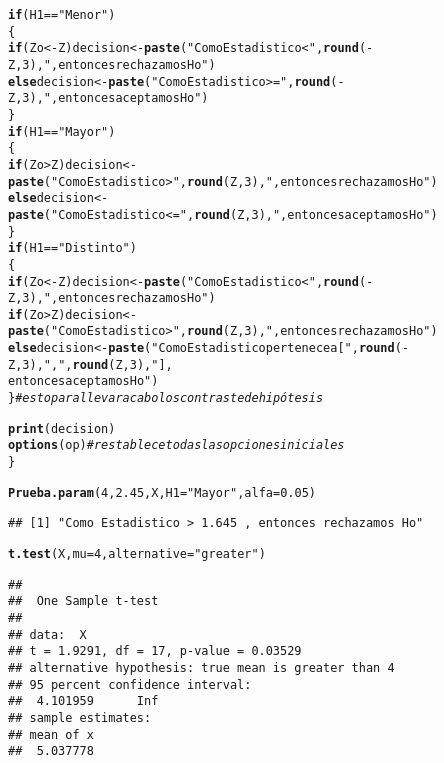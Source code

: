 \documentclass[10pt,a4paper]{article}\usepackage[]{graphicx}\usepackage[]{color}
\makeatletter
\newcommand{\hlnum}[1]{\textcolor[rgb]{0.686,0.059,0.569}{#1}}%
\newcommand{\hlstr}[1]{\textcolor[rgb]{0.192,0.494,0.8}{#1}}%
\newcommand{\hlcom}[1]{\textcolor[rgb]{0.678,0.584,0.686}{\textit{#1}}}%
\newcommand{\hlopt}[1]{\textcolor[rgb]{0,0,0}{#1}}%
\newcommand{\hlstd}[1]{\textcolor[rgb]{0.345,0.345,0.345}{#1}}%
\newcommand{\hlkwa}[1]{\textcolor[rgb]{0.161,0.373,0.58}{\textbf{#1}}}%
\newcommand{\hlkwb}[1]{\textcolor[rgb]{0.69,0.353,0.396}{#1}}%
\newcommand{\hlkwc}[1]{\textcolor[rgb]{0.333,0.667,0.333}{#1}}%
\newcommand{\hlkwd}[1]{\textcolor[rgb]{0.737,0.353,0.396}{\textbf{#1}}}%
\newenvironment{kframe}{%
 \def\at@end@of@kframe{}%
 \ifinner\ifhmode%
  \def\at@end@of@kframe{\end{minipage}}%
  \begin{minipage}{\columnwidth}%
 \fi\fi%
 \def\FrameCommand##1{\hskip\@totalleftmargin \hskip-\fboxsep
 \colorbox{shadecolor}{##1}\hskip-\fboxsep
     \hskip-\linewidth \hskip-\@totalleftmargin \hskip\columnwidth}%
 \MakeFramed {\advance\hsize-\width
   \@totalleftmargin\z@ \linewidth\hsize
   \@setminipage}}%
 {\par\unskip\endMakeFramed%
 \at@end@of@kframe}
\newenvironment{knitrout}{}{} %
\makeatother
\begin{document}
\begin{knitrout}
\begin{kframe}
\begin{alltt}
  \hlkwa{if} \hlstd{(H1} \hlopt{==} \hlstr{"Menor"}\hlstd{)}
  \hlstd{\{}
    \hlkwa{if} \hlstd{(Zo} \hlopt{< -}\hlstd{Z) decision} \hlkwb{<-} \hlkwd{paste}\hlstd{(}\hlstr{"Como Estadistico <"}\hlstd{,} \hlkwd{round}\hlstd{(}\hlopt{-}\hlstd{Z,}\hlnum{3}\hlstd{),} \hlstr{", entonces rechazamos Ho"}\hlstd{)}
    \hlkwa{else} \hlstd{decision} \hlkwb{<-} \hlkwd{paste}\hlstd{(}\hlstr{"Como Estadistico>="}\hlstd{,} \hlkwd{round}\hlstd{(}\hlopt{-}\hlstd{Z,}\hlnum{3}\hlstd{),} \hlstr{", entonces aceptamos Ho"}\hlstd{)}
  \hlstd{\}}
  \hlkwa{if} \hlstd{(H1} \hlopt{==} \hlstr{"Mayor"}\hlstd{)}
  \hlstd{\{}
    \hlkwa{if} \hlstd{(Zo} \hlopt{>} \hlstd{Z) decision} \hlkwb{<-} \hlkwd{paste}\hlstd{(}\hlstr{"Como Estadistico >"}\hlstd{,} \hlkwd{round}\hlstd{(Z,}\hlnum{3}\hlstd{),} \hlstr{", entonces rechazamos Ho"}\hlstd{)}
    \hlkwa{else} \hlstd{decision} \hlkwb{<-} \hlkwd{paste}\hlstd{(}\hlstr{"Como Estadistico <="}\hlstd{,} \hlkwd{round}\hlstd{(Z,}\hlnum{3}\hlstd{),} \hlstr{", entonces aceptamos Ho"}\hlstd{)}
  \hlstd{\}}
  \hlkwa{if} \hlstd{(H1} \hlopt{==} \hlstr{"Distinto"}\hlstd{)}
  \hlstd{\{}
    \hlkwa{if} \hlstd{(Zo} \hlopt{< -}\hlstd{Z) decision} \hlkwb{<-} \hlkwd{paste}\hlstd{(}\hlstr{"Como Estadistico <"}\hlstd{,} \hlkwd{round}\hlstd{(}\hlopt{-}\hlstd{Z,}\hlnum{3}\hlstd{),} \hlstr{", entonces rechazamos Ho"}\hlstd{)}
    \hlkwa{if} \hlstd{(Zo} \hlopt{>} \hlstd{Z) decision} \hlkwb{<-} \hlkwd{paste}\hlstd{(}\hlstr{"Como Estadistico >"}\hlstd{,} \hlkwd{round}\hlstd{(Z,}\hlnum{3}\hlstd{),} \hlstr{", entonces rechazamos Ho"}\hlstd{)}
    \hlkwa{else} \hlstd{decision} \hlkwb{<-} \hlkwd{paste}\hlstd{(}\hlstr{"Como Estadistico pertenece a ["}\hlstd{,} \hlkwd{round}\hlstd{(}\hlopt{-}\hlstd{Z,}\hlnum{3}\hlstd{),} \hlstr{","}\hlstd{,} \hlkwd{round}\hlstd{(Z,}\hlnum{3}\hlstd{),} \hlstr{"],
                           entonces aceptamos Ho"}\hlstd{)}
  \hlstd{\}} \hlcom{# esto para llevar a cabo los contraste de hipótesis}

  \hlkwd{print}\hlstd{(decision)}
  \hlkwd{options}\hlstd{(op)} \hlcom{# restablece todas las opciones iniciales}
  \hlstd{\}}

\hlkwd{Prueba.param}\hlstd{(}\hlnum{4}\hlstd{,} \hlnum{2.45}\hlstd{, X,} \hlkwc{H1}\hlstd{=}\hlstr{"Mayor"}\hlstd{,} \hlkwc{alfa}\hlstd{=}\hlnum{0.05}\hlstd{)}
\end{alltt}
\begin{verbatim}
## [1] "Como Estadistico > 1.645 , entonces rechazamos Ho"
\end{verbatim}
\begin{alltt}
\hlkwd{t.test}\hlstd{(X,}\hlkwc{mu}\hlstd{=}\hlnum{4}\hlstd{,}\hlkwc{alternative}\hlstd{=}\hlstr{"greater"}\hlstd{)}
\end{alltt}
\begin{verbatim}
## 
## 	One Sample t-test
## 
## data:  X
## t = 1.9291, df = 17, p-value = 0.03529
## alternative hypothesis: true mean is greater than 4
## 95 percent confidence interval:
##  4.101959      Inf
## sample estimates:
## mean of x 
##  5.037778
\end{verbatim}
\end{kframe}
\end{knitrout}
\end{document}
